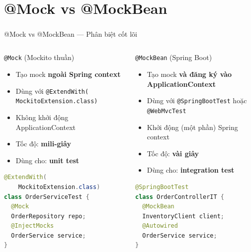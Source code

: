 \documentclass[aspectratio=169,10pt]{beamer}
\newcommand{\sref}[1]{\textsuperscript{\scriptsize\cite{#1}}}
\begin{document}
\section{@Mock vs @MockBean}

\begin{frame}[fragile,shrink=12]{@Mock vs @MockBean --- Phân biệt cốt lõi\sref{mockito}}
  \begin{columns}
    \begin{block}{\texttt{@Mock} (Mockito thuần)}
      \begin{itemize}
        \item Tạo mock \textbf{ngoài Spring context}
        \item Dùng với \texttt{@ExtendWith(
    MockitoExtension.class)}
        \item Không khởi động ApplicationContext
        \item Tốc độ: \textbf{mili-giây}
        \item Dùng cho: \textbf{unit test}
      \end{itemize}
\begin{lstlisting}[language=java,style=small]
@ExtendWith(
    MockitoExtension.class)
class OrderServiceTest {
  @Mock
  OrderRepository repo;
  @InjectMocks
  OrderService service;
}
\end{lstlisting}
    \end{block}

    \begin{block}{\texttt{@MockBean} (Spring Boot)}
      \begin{itemize}
        \item Tạo mock \textbf{và đăng ký vào ApplicationContext}
        \item Dùng với \texttt{@SpringBootTest} hoặc \texttt{@WebMvcTest}
        \item Khởi động (một phần) Spring context
        \item Tốc độ: \textbf{vài giây}
        \item Dùng cho: \textbf{integration test}
      \end{itemize}
\begin{lstlisting}[language=java,style=small]
@SpringBootTest
class OrderControllerIT {
  @MockBean
  InventoryClient client;
  @Autowired
  OrderService service;
}
\end{lstlisting}
    \end{block}
  \end{columns}
\end{frame}
\end{document}
